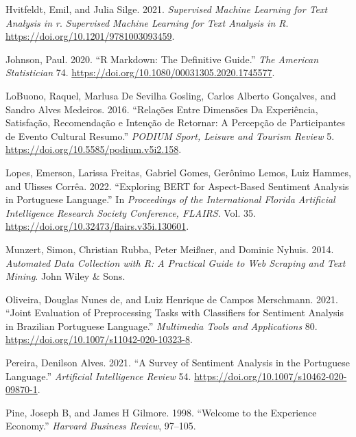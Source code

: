 \documentclass[preprint, 3p,
authoryear]{elsarticle} %
\newlength{\cslhangindent}
\newlength{\cslentryspacingunit} %
\newenvironment{CSLReferences}[2] %
 {%
  \setlength{\parindent}{0pt}
  \ifodd #1
  \let\oldpar\par
  \def\par{\hangindent=\cslhangindent\oldpar}
  \fi
  \setlength{\parskip}{#2\cslentryspacingunit}
 }%
 {}
\begin{document}
\begin{CSLReferences}{1}{0}
\leavevmode{}%
Hvitfeldt, Emil, and Julia Silge. 2021. \emph{Supervised Machine
Learning for Text Analysis in r}. \emph{Supervised Machine Learning for
Text Analysis in R}. \url{https://doi.org/10.1201/9781003093459}.

\leavevmode{}%
Johnson, Paul. 2020. {``R Markdown: The Definitive Guide.''} \emph{The
American Statistician} 74.
\url{https://doi.org/10.1080/00031305.2020.1745577}.

\leavevmode{}%
LoBuono, Raquel, Marlusa De Sevilha Gosling, Carlos Alberto Gonçalves,
and Sandro Alves Medeiros. 2016. {``Relações Entre Dimensões Da
Experiência, Satisfação, Recomendação e Intenção de Retornar: A
Percepção de Participantes de Evento Cultural Resumo.''} \emph{PODIUM
Sport, Leisure and Tourism Review} 5.
\url{https://doi.org/10.5585/podium.v5i2.158}.

\leavevmode{}%
Lopes, Emerson, Larissa Freitas, Gabriel Gomes, Gerônimo Lemos, Luiz
Hammes, and Ulisses Corrêa. 2022. {``Exploring BERT for Aspect-Based
Sentiment Analysis in Portuguese Language.''} In \emph{Proceedings of
the International Florida Artificial Intelligence Research Society
Conference, FLAIRS}. Vol. 35.
\url{https://doi.org/10.32473/flairs.v35i.130601}.

\leavevmode{}%
Munzert, Simon, Christian Rubba, Peter Meißner, and Dominic Nyhuis.
2014. \emph{Automated Data Collection with {R}: A Practical Guide to Web
Scraping and Text Mining}. John Wiley \& Sons.

\leavevmode{}%
Oliveira, Douglas Nunes de, and Luiz Henrique de Campos Merschmann.
2021. {``Joint Evaluation of Preprocessing Tasks with Classifiers for
Sentiment Analysis in Brazilian Portuguese Language.''} \emph{Multimedia
Tools and Applications} 80.
\url{https://doi.org/10.1007/s11042-020-10323-8}.

\leavevmode{}%
Pereira, Denilson Alves. 2021. {``A Survey of Sentiment Analysis in the
Portuguese Language.''} \emph{Artificial Intelligence Review} 54.
\url{https://doi.org/10.1007/s10462-020-09870-1}.

\leavevmode{}%
Pine, Joseph B, and James H Gilmore. 1998. {``Welcome to the Experience
Economy.''} \emph{Harvard Business Review}, 97--105.


\end{CSLReferences}
\end{document}
